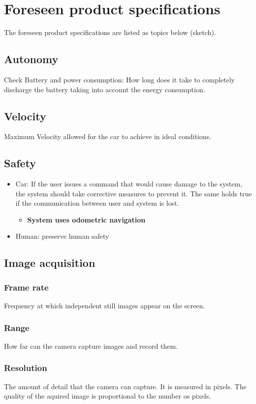 \section{Foreseen product specifications}%
\label{sec:org31f7574}
The foreseen product specifications are listed as topics below (sketch).

\subsection{Autonomy}%
\label{sec:orge975868}
Check Battery and power consumption: How long does it take to completely discharge the battery taking into account the energy consumption.
\subsection{Velocity}%
\label{sec:org08718bc}
Maximum Velocity allowed for the car to achieve in ideal conditions.
\subsection{Safety}%
\label{sec:org83942c3}
\begin{itemize}
\item Car: If the user issues a command that would cause damage to the system, the
system should take corrective measures to prevent it. The same holds true if
the communication between user and system is lost.
\begin{itemize}
\item \textbf{System uses odometric navigation}
\end{itemize}
\item Human: preserve human safety
\end{itemize}
\subsection{Image acquisition}%
\label{sec:orgb6a5f66}
\subsubsection{Frame rate}%
\label{sec:org5adf4ee}
Frequency at which independent still images appear on the screen.
\subsubsection{Range}%
\label{sec:orgecb044c}
How far can the camera capture images and record them.
\subsubsection{Resolution}%
\label{sec:orgba87554}
The amount of detail that the camera can capture. It is measured in pixels. The quality of the aquired image is proportional to the number os pixels.
